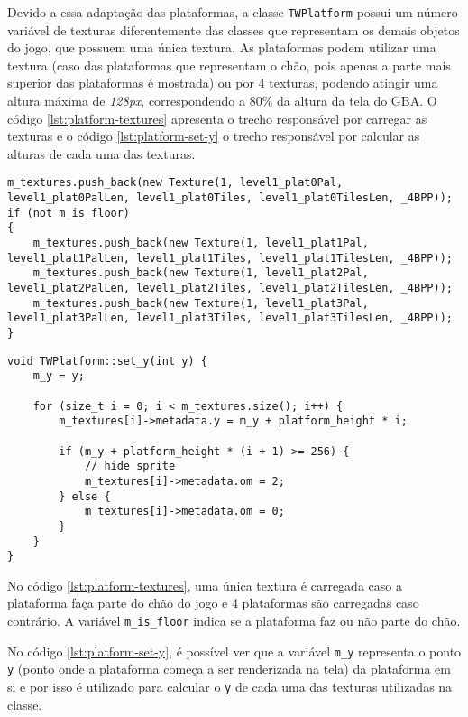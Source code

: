 Devido a essa adaptação das plataformas, a classe \texttt{TWPlatform} possui um número variável de texturas diferentemente das classes que representam os demais objetos do jogo, que possuem uma única textura. As plataformas podem utilizar uma textura (caso das plataformas que representam o chão, pois apenas a parte mais superior das plataformas é mostrada) ou por 4 texturas, podendo atingir uma altura máxima de \textit{128px}, correspondendo a 80\% da altura da tela do GBA. O código \ref{lst:platform-textures} apresenta o trecho responsável por carregar as texturas e o código \ref{lst:platform-set-y} o trecho responsável por calcular as alturas de cada uma das texturas.

\begin{lstlisting}[caption={\texttt{std::vector} com as texturas das plataformas sendo preenchido.},label={lst:platform-textures}]
m_textures.push_back(new Texture(1, level1_plat0Pal, level1_plat0PalLen, level1_plat0Tiles, level1_plat0TilesLen, _4BPP));
if (not m_is_floor)
{
    m_textures.push_back(new Texture(1, level1_plat1Pal, level1_plat1PalLen, level1_plat1Tiles, level1_plat1TilesLen, _4BPP));
    m_textures.push_back(new Texture(1, level1_plat2Pal, level1_plat2PalLen, level1_plat2Tiles, level1_plat2TilesLen, _4BPP));
    m_textures.push_back(new Texture(1, level1_plat3Pal, level1_plat3PalLen, level1_plat3Tiles, level1_plat3TilesLen, _4BPP));
}
\end{lstlisting}

\begin{lstlisting}[caption={Cálculo das alturas das texturas utilizadas nas plataformas},label={lst:platform-set-y}]
void TWPlatform::set_y(int y) {
    m_y = y;

    for (size_t i = 0; i < m_textures.size(); i++) {
        m_textures[i]->metadata.y = m_y + platform_height * i;

        if (m_y + platform_height * (i + 1) >= 256) {
            // hide sprite
            m_textures[i]->metadata.om = 2;
        } else {
            m_textures[i]->metadata.om = 0;
        }
    }
}
\end{lstlisting}

No código \ref{lst:platform-textures}, uma única textura é carregada caso a plataforma faça parte do chão do jogo e 4 plataformas são carregadas caso contrário. A variável \texttt{m\_is\_floor} indica se a plataforma faz ou não parte do chão. 

No código \ref{lst:platform-set-y}, é possível ver que a variável \texttt{m\_y} representa o ponto \texttt{y} (ponto onde a plataforma começa a ser renderizada na tela) da plataforma em si e por isso é utilizado para calcular o \texttt{y} de cada uma das texturas utilizadas na classe.

